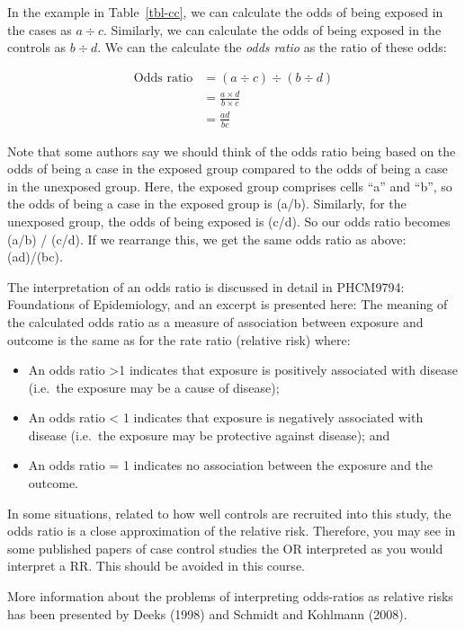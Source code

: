 \documentclass[
  a4paper,
]{memoir}
\providecommand{\tightlist}{%
  \setlength{\itemsep}{0pt}\setlength{\parskip}{0pt}}
\begin{document}
In the example in Table~\ref{tbl-cc}, we can calculate the odds of being
exposed in the cases as \(a \div c\). Similarly, we can calculate the
odds of being exposed in the controls as \(b \div d\). We can the
calculate the \emph{odds ratio} as the ratio of these odds:

\[
\begin{aligned}
\text{Odds ratio} &= (a \div c) \div (b \div d) \\
 &= \frac{a \times d}{b \times c} \\
 &= \frac{ad}{bc}
\end{aligned}
\]

Note that some authors say we should think of the odds ratio being based
on the odds of being a case in the exposed group compared to the odds of
being a case in the unexposed group. Here, the exposed group comprises
cells ``a'' and ``b'', so the odds of being a case in the exposed group
is (a/b). Similarly, for the unexposed group, the odds of being exposed
is (c/d). So our odds ratio becomes (a/b) / (c/d). If we rearrange this,
we get the same odds ratio as above: (ad)/(bc).

The interpretation of an odds ratio is discussed in detail in PHCM9794:
Foundations of Epidemiology, and an excerpt is presented here: The
meaning of the calculated odds ratio as a measure of association between
exposure and outcome is the same as for the rate ratio (relative risk)
where:

\begin{itemize}
\tightlist
\item
  An odds ratio \textgreater1 indicates that exposure is positively
  associated with disease (i.e.~the exposure may be a cause of disease);
\item
  An odds ratio \textless{} 1 indicates that exposure is negatively
  associated with disease (i.e.~the exposure may be protective against
  disease); and
\item
  An odds ratio = 1 indicates no association between the exposure and
  the outcome.
\end{itemize}

In some situations, related to how well controls are recruited into this
study, the odds ratio is a close approximation of the relative risk.
Therefore, you may see in some published papers of case control studies
the OR interpreted as you would interpret a RR. This should be avoided
in this course.

More information about the problems of interpreting odds-ratios as
relative risks has been presented by Deeks (1998) and Schmidt and
Kohlmann (2008).
\end{document}
